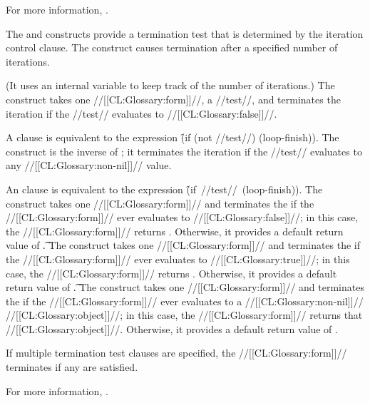 For more information, \seesection\LOOPValAcc.

\endsubsubsubsection%

  The  and  constructs provide a termination test that is determined by the iteration control clause.
  The  construct causes termination after a specified number of iterations.

(It uses an internal variable to keep track of the number of iterations.)
  The  construct takes one //[[CL:Glossary:form]]//, a //test//,  and terminates the iteration if the //test// evaluates to //[[CL:Glossary:false]]//.

A  clause is equivalent to the expression  \f{(if (not //test//) (loop-finish))}.
  The  construct is the inverse of ; it terminates the iteration if the //test// evaluates to any //[[CL:Glossary:non-nil]]// value.

An  clause is equivalent to the expression \hbox{\f{(if //test// (loop-finish))}}.
  The  construct takes one //[[CL:Glossary:form]]// and terminates the  if the //[[CL:Glossary:form]]// ever evaluates to //[[CL:Glossary:false]]//; in this case, the  //[[CL:Glossary:form]]// returns \nil. Otherwise, it provides a default return value of \t.
  The  construct takes one //[[CL:Glossary:form]]// and terminates the  if the //[[CL:Glossary:form]]// ever evaluates to //[[CL:Glossary:true]]//; in this case, the  //[[CL:Glossary:form]]// returns \nil. Otherwise, it provides a default return value of \t.
  The  construct takes one //[[CL:Glossary:form]]// and terminates the  if the //[[CL:Glossary:form]]// ever evaluates to a //[[CL:Glossary:non-nil]]// //[[CL:Glossary:object]]//; in this case, the  //[[CL:Glossary:form]]// returns that //[[CL:Glossary:object]]//.  Otherwise, it provides a default return value of \nil.

If multiple termination test clauses are specified,  the  //[[CL:Glossary:form]]// terminates if any are satisfied.


  For more information, \seesection\LOOPTermTest.

\endsubsubsubsection%

